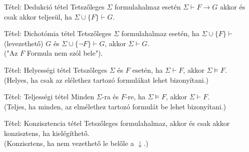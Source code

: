 \documentclass{beamer}
\begin{document}
\begin{frame}

\begin{block}{Tétel: Dedukció tétel}
Tetszőleges $\Sigma$ formulahalmaz esetén $\Sigma \vdash F \rightarrow G$ akkor és csak akkor teljesül, ha $\Sigma \cup \{F\} \vdash G$.
\end{block}

\begin{block}{Tétel: Dichotómia tétel}
Tetszőleges $\Sigma$ formulahalmaz esetén, ha $\Sigma \cup \{F\} \vdash$ (levezethető) $G$ és $\Sigma \cup \{\neg F\} \vdash G$, akkor $\Sigma \vdash G$.\\
("Az $F$ Formula nem szól bele").
\end{block}

\begin{block}{Tétel: Helyességi tétel}
Tetszőleges $\Sigma$ és $F$ esetén, ha $\Sigma \vdash F$, akkor $\Sigma \models F$.\\
(Helyes, ha csak az elélethez tartozó formulákat lehet bizonyítani.)
\end{block}

\begin{block}{Tétel: Teljességi tétel}
Minden $\Sigma$-ra és $F$-re, ha $\Sigma \models F$, akkor $\Sigma \vdash F$.\\
(Teljes, ha minden, az elmélethez tartozó formulát be lehet bizonyítani.)
\end{block}

\begin{block}{Tétel: Konzisztencia tétel}
Tetszőleges formulahalmaz, akkor és csak akkor konzisztens, ha kielégíthető.\\
(Konzisztens, ha nem vezethető le belőle a $\downarrow$.)
\end{block}

\end{frame}


\begin{frame}[plain]
\end{frame}
\end{document}
